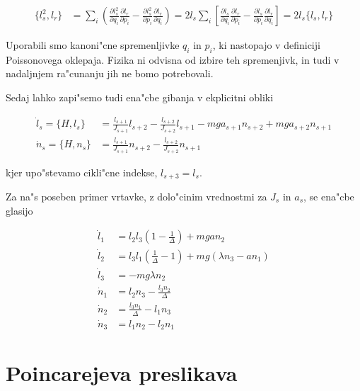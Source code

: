 \documentclass[a4paper,10pt]{article}
\newcommand{\parcialno}[2]{
  \frac{\partial #1}{\partial #2}
}
\begin{document}
\begin{align}
  \{l_s^2, l_r\} &= \sum_i\left( \parcialno{l_s^2}{q_i}\parcialno{l_r}{p_i} - \parcialno{l_s^2}{p_i}\parcialno{l_r}{q_i} \right) = 2l_s \sum_i\left[ \parcialno{l_s}{q_i}\parcialno{l_r}{p_i} - \parcialno{l_s}{p_i}\parcialno{l_r}{q_i} \right] = 2l_s \{l_s, l_r\}
\end{align}

Uporabili smo kanoni"cne spremenljivke $q_i$ in $p_i$, ki nastopajo v definiciji Poissonovega oklepaja. Fizika ni odvisna od izbire teh spremenjivk, in tudi v nadaljnjem ra"cunanju jih ne bomo potrebovali. 

Sedaj lahko zapi"semo tudi ena"cbe gibanja v ekplicitni obliki

\begin{align}
  \dot l_s = \{H,l_s\} &= \frac{l_{s+1}}{J_{s+1}}l_{s+2} - \frac{l_{s+2}}{J_{s+2}}l_{s+1} - mga_{s+1}n_{s+2} + mga_{s+2}n_{s+1} \\
  \dot n_s = \{H,n_s\} &= \frac{l_{s+1}}{J_{s+1}}n_{s+2} - \frac{l_{s+2}}{J_{s+2}}n_{s+1}
\end{align}

kjer upo"stevamo cikli"cne indekse, $l_{s+3} = l_s$. 

Za na"s poseben primer vrtavke, z dolo"cinim vrednostmi za $J_s$ in $a_s$, se ena"cbe glasijo

\begin{align}
  \dot l_1 &= l_2l_3 \left( 1 - \frac{1}{\Delta} \right) + mgan_2 \\
  \dot l_2 &= l_3l_1 \left( \frac{1}{\Delta} - 1 \right) + mg\left( \lambda n_3 - a n_1 \right) \\
  \dot l_3 &= -mg \lambda n_2 \\
  \dot n_1 &= l_2n_3 - \frac{l_3n_2}{\Delta} \\
  \dot n_2 &= \frac{l_3n_1}{\Delta} - l_1n_3 \\
  \dot n_3 &= l_1 n_2 - l_2 n_1
\end{align}

\section{Poincarejeva preslikava}
\end{document}
